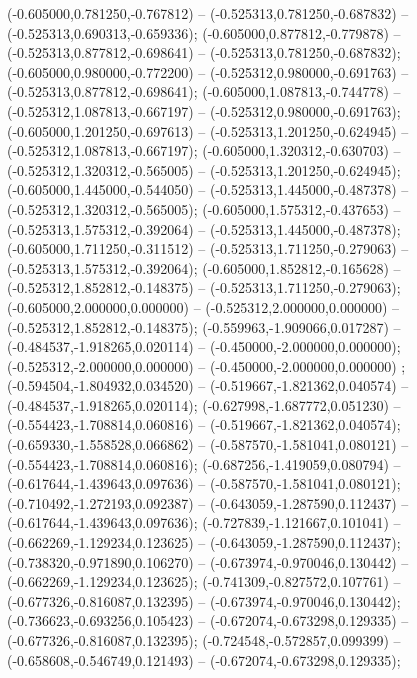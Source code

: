  (-0.605000,0.781250,-0.767812) -- (-0.525313,0.781250,-0.687832) -- (-0.525313,0.690313,-0.659336);
 (-0.605000,0.877812,-0.779878) -- (-0.525313,0.877812,-0.698641) -- (-0.525313,0.781250,-0.687832);
 (-0.605000,0.980000,-0.772200) -- (-0.525312,0.980000,-0.691763) -- (-0.525313,0.877812,-0.698641);
 (-0.605000,1.087813,-0.744778) -- (-0.525312,1.087813,-0.667197) -- (-0.525312,0.980000,-0.691763);
 (-0.605000,1.201250,-0.697613) -- (-0.525313,1.201250,-0.624945) -- (-0.525312,1.087813,-0.667197);
 (-0.605000,1.320312,-0.630703) -- (-0.525312,1.320312,-0.565005) -- (-0.525313,1.201250,-0.624945);
 (-0.605000,1.445000,-0.544050) -- (-0.525313,1.445000,-0.487378) -- (-0.525312,1.320312,-0.565005);
 (-0.605000,1.575312,-0.437653) -- (-0.525313,1.575312,-0.392064) -- (-0.525313,1.445000,-0.487378);
 (-0.605000,1.711250,-0.311512) -- (-0.525313,1.711250,-0.279063) -- (-0.525313,1.575312,-0.392064);
 (-0.605000,1.852812,-0.165628) -- (-0.525312,1.852812,-0.148375) -- (-0.525313,1.711250,-0.279063);
 (-0.605000,2.000000,0.000000) -- (-0.525312,2.000000,0.000000) -- (-0.525312,1.852812,-0.148375);
 (-0.559963,-1.909066,0.017287) -- (-0.484537,-1.918265,0.020114) -- (-0.450000,-2.000000,0.000000);
 (-0.525312,-2.000000,0.000000) -- (-0.450000,-2.000000,0.000000) ;
 (-0.594504,-1.804932,0.034520) -- (-0.519667,-1.821362,0.040574) -- (-0.484537,-1.918265,0.020114);
 (-0.627998,-1.687772,0.051230) -- (-0.554423,-1.708814,0.060816) -- (-0.519667,-1.821362,0.040574);
 (-0.659330,-1.558528,0.066862) -- (-0.587570,-1.581041,0.080121) -- (-0.554423,-1.708814,0.060816);
 (-0.687256,-1.419059,0.080794) -- (-0.617644,-1.439643,0.097636) -- (-0.587570,-1.581041,0.080121);
 (-0.710492,-1.272193,0.092387) -- (-0.643059,-1.287590,0.112437) -- (-0.617644,-1.439643,0.097636);
 (-0.727839,-1.121667,0.101041) -- (-0.662269,-1.129234,0.123625) -- (-0.643059,-1.287590,0.112437);
 (-0.738320,-0.971890,0.106270) -- (-0.673974,-0.970046,0.130442) -- (-0.662269,-1.129234,0.123625);
 (-0.741309,-0.827572,0.107761) -- (-0.677326,-0.816087,0.132395) -- (-0.673974,-0.970046,0.130442);
 (-0.736623,-0.693256,0.105423) -- (-0.672074,-0.673298,0.129335) -- (-0.677326,-0.816087,0.132395);
 (-0.724548,-0.572857,0.099399) -- (-0.658608,-0.546749,0.121493) -- (-0.672074,-0.673298,0.129335);

